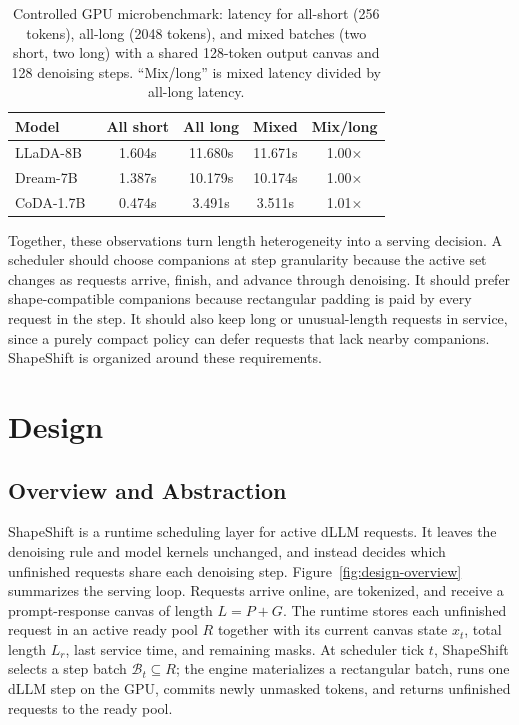 \documentclass[a4paper]{llncs}
\begin{document}
\begin{table}[t]
\centering
\caption{Controlled GPU microbenchmark: latency for all-short (256 tokens), all-long (2048 tokens), and mixed batches (two short, two long) with a shared 128-token output canvas and 128 denoising steps. ``Mix/long'' is mixed latency divided by all-long latency.}
\label{tab:motivation-probe}
\scriptsize
\setlength{\tabcolsep}{2.8pt}
\begin{tabular}{lcccc}
\toprule
Model & All short & All long & Mixed & Mix/long \\
\midrule
LLaDA-8B~\cite{nie2025llada} & 1.604s & 11.680s & 11.671s & 1.00$\times$ \\
Dream-7B~\cite{dream2025} & 1.387s & 10.179s & 10.174s & 1.00$\times$ \\
CoDA-1.7B~\cite{coda2025} & 0.474s & 3.491s & 3.511s & 1.01$\times$ \\
\bottomrule
\end{tabular}
\end{table}

Together, these observations turn length heterogeneity into a serving decision. A scheduler should choose companions at step granularity because the active set changes as requests arrive, finish, and advance through denoising. It should prefer shape-compatible companions because rectangular padding is paid by every request in the step. It should also keep long or unusual-length requests in service, since a purely compact policy can defer requests that lack nearby companions. ShapeShift is organized around these requirements.

\section{Design}

\subsection{Overview and Abstraction}

ShapeShift is a runtime scheduling layer for active dLLM requests. It leaves the denoising rule and model kernels unchanged, and instead decides which unfinished requests share each denoising step. Figure~\ref{fig:design-overview} summarizes the serving loop. Requests arrive online, are tokenized, and receive a prompt-response canvas of length $L=P+G$. The runtime stores each unfinished request in an active ready pool $R$ together with its current canvas state $x_t$, total length $L_r$, last service time, and remaining masks. At scheduler tick $t$, ShapeShift selects a step batch $\mathcal{B}_t\subseteq R$; the engine materializes a rectangular batch, runs one dLLM step on the GPU, commits newly unmasked tokens, and returns unfinished requests to the ready pool.
\end{document}
